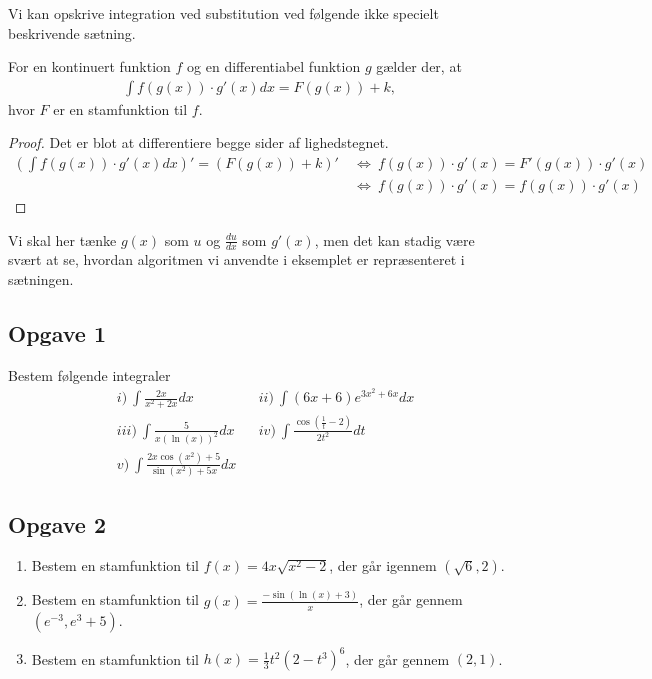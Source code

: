Vi kan opskrive integration ved substitution ved følgende ikke specielt beskrivende sætning.
\begin{setn}
	For en kontinuert funktion $f$ og en differentiabel funktion $g$ gælder der, at
	\begin{align*}
		\int f(g(x))\cdot g'(x) dx = F(g(x)) + k,
	\end{align*}
	hvor $F$ er en stamfunktion til $f$. 
\end{setn}
\begin{proof}
	Det er blot at differentiere begge sider af lighedstegnet.
	\begin{align*}
		\left(\int f(g(x))\cdot g'(x) dx\right)' = (F(g(x)) + k)' 
		&\ \Leftrightarrow \ f(g(x))\cdot g'(x) = F'(g(x))\cdot g'(x)	 \\
		&\ \Leftrightarrow \ f(g(x))\cdot g'(x) = f(g(x))\cdot g'(x)	 
	\end{align*}
\end{proof}
Vi skal her tænke $g(x)$ som $u$ og $\frac{du}{dx}$ som $g'(x)$, men det kan stadig være svært at se, hvordan algoritmen vi anvendte i eksemplet er repræsenteret i sætningen. 

\subsection*{Opgave 1}
Bestem følgende integraler
\begin{align*}
	&i) \ \int \frac{2x}{x^2+2x} dx  & &ii) \ \int (6x+6)e^{3x^2+6x} dx \\
	&iii) \ \int \frac{5}{x(\ln(x))^2} dx & &iv) \ \int \frac{\cos(\frac{1}{t}-2)}{2t^2} dt \\
	&v) \ \int \frac{2x\cos(x^2)+5}{\sin(x^2)+5x} dx 
\end{align*}
\subsection*{Opgave 2}
\begin{enumerate}[label = \roman*)]
	\item Bestem en stamfunktion til $f(x) = 4x\sqrt{x^2-2}$, der går igennem $(\sqrt{6},2)$.
	\item Bestem en stamfunktion til $g(x) = \frac{-\sin(\ln(x)+3)}{x}$, der går gennem $(e^{-3},e^3+5)$.
	\item Bestem en stamfunktion til $h(x) = \frac{1}{3}t^2(2-t^3)^6$, der går gennem $(2,1)$.
\end{enumerate}


